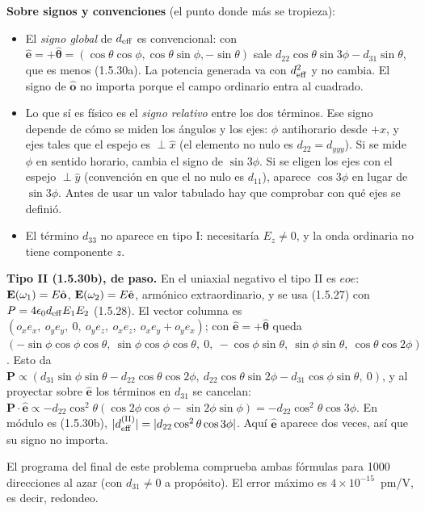 \textbf{Sobre signos y convenciones} (el punto donde más se tropieza):
\begin{itemize}
\item El \emph{signo global} de $d_{\rm eff}$ es convencional: con $\hat{\mathbf e}=+\hat{\boldsymbol\theta}=(\cos\theta\cos\phi,\cos\theta\sin\phi,-\sin\theta)$ sale
$d_{22}\cos\theta\sin3\phi-d_{31}\sin\theta$, que es menos (1.5.30a). La potencia generada va con $d_{\rm eff}^2$ y no cambia. El signo de $\hat{\mathbf o}$
no importa porque el campo ordinario entra al cuadrado.
\item Lo que sí es físico es el \emph{signo relativo} entre los dos términos. Ese signo depende de cómo se miden los ángulos y los ejes:
$\phi$ antihorario desde $+x$, y ejes tales que el espejo es $\perp\hat x$ (el elemento no nulo es $d_{22}=d_{yyy}$). Si se mide $\phi$ en sentido horario,
cambia el signo de $\sin3\phi$. Si se eligen los ejes con el espejo $\perp\hat y$ (convención en que el no nulo es $d_{11}$), aparece $\cos3\phi$ en lugar de $\sin3\phi$.
Antes de usar un valor tabulado hay que comprobar con qué ejes se definió.
\item El término $d_{33}$ no aparece en tipo I: necesitaría $E_z\neq0$, y la onda ordinaria no tiene componente $z$.
\end{itemize}
\textbf{Tipo II (1.5.30b), de paso.} En el uniaxial negativo el tipo II es $eoe$: $\mathbf E(\omega_1)=E\hat{\mathbf o}$, $\mathbf E(\omega_2)=E\hat{\mathbf e}$, armónico extraordinario,
y se usa (1.5.27) con $P=4\epsilon_0d_{\rm eff}E_1E_2$ (1.5.28). El vector columna es
$(o_xe_x,\ o_ye_y,\ 0,\ o_ye_z,\ o_xe_z,\ o_xe_y+o_ye_x)$; con $\hat{\mathbf e}=+\hat{\boldsymbol\theta}$ queda
$(-\sin\phi\cos\phi\cos\theta,\ \sin\phi\cos\phi\cos\theta,\ 0,\ -\cos\phi\sin\theta,\ \sin\phi\sin\theta,\ \cos\theta\cos2\phi)$.
Esto da $\mathbf P\propto(d_{31}\sin\phi\sin\theta-d_{22}\cos\theta\cos2\phi,\ d_{22}\cos\theta\sin2\phi-d_{31}\cos\phi\sin\theta,\ 0)$, y al proyectar sobre
$\hat{\mathbf e}$ los términos en $d_{31}$ se cancelan:
$\mathbf P\cdot\hat{\mathbf e}\propto-d_{22}\cos^2\theta(\cos2\phi\cos\phi-\sin2\phi\sin\phi)=-d_{22}\cos^2\theta\cos3\phi$. En módulo es (1.5.30b),
$|d_{\rm eff}^{\rm (II)}|=|d_{22}\cos^2\theta\cos3\phi|$. Aquí $\hat{\mathbf e}$ aparece dos veces, así que su signo no importa.

El programa del final de este problema comprueba ambas fórmulas para 1000 direcciones al azar (con $d_{31}\neq0$ a propósito). El error máximo es
$4\times10^{-15}$~pm/V, es decir, redondeo.

